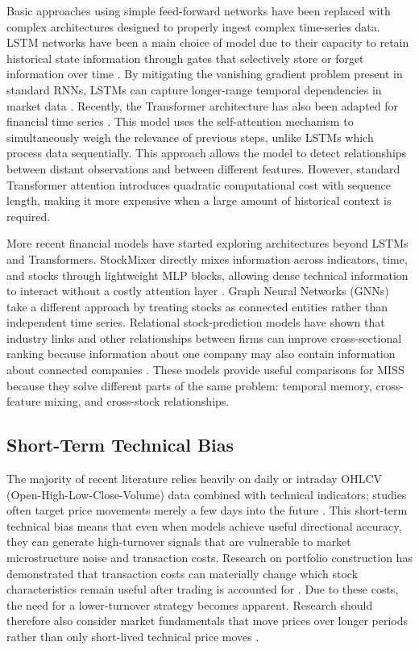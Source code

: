 \documentclass[11pt,twocolumn]{article}
\begin{document}
Basic approaches using simple feed-forward networks have been replaced
with complex architectures designed to properly ingest complex
time-series data. LSTM networks have been a main choice of model due to
their capacity to retain historical state information through gates that
selectively store or forget information over time \cite{hochreiter1997}.
By mitigating the vanishing gradient problem present in standard RNNs,
LSTMs can capture longer-range temporal dependencies in market data
\cite{rumelhart1986}. Recently, the Transformer architecture has also
been adapted for financial time series \cite{vaswani2017}. This model
uses the self-attention mechanism to simultaneously weigh the relevance
of previous steps, unlike LSTMs which process data sequentially. This
approach allows the model to detect relationships between distant
observations and between different features. However, standard
Transformer attention introduces quadratic computational cost with
sequence length, making it more expensive when a large amount of
historical context is required.

More recent financial models have started exploring architectures beyond
LSTMs and Transformers. StockMixer directly mixes information across
indicators, time, and stocks through lightweight MLP blocks, allowing
dense technical information to interact without a costly attention layer
\cite{fan2024}. Graph Neural Networks (GNNs) take a different approach by
treating stocks as connected entities rather than independent time
series. Relational stock-prediction models have shown that industry
links and other relationships between firms can improve cross-sectional
ranking because information about one company may also contain
information about connected companies \cite{feng2019,qian2024}. These
models provide useful comparisons for MISS because they solve different
parts of the same problem: temporal memory, cross-feature mixing, and
cross-stock relationships.

\subsection{Short-Term Technical Bias}

The majority of recent literature relies heavily on daily or intraday
OHLCV (Open-High-Low-Close-Volume) data combined with technical
indicators; studies often target price movements merely a few days into
the future \cite{fischer2018}. This short-term technical bias means that
even when models achieve useful directional accuracy, they can generate
high-turnover signals that are vulnerable to market microstructure noise
and transaction costs. Research on portfolio construction has
demonstrated that transaction costs can materially change which stock
characteristics remain useful after trading is accounted for
\cite{demiguel2020}. Due to these costs, the need for a lower-turnover
strategy becomes apparent. Research should therefore also consider market
fundamentals that move prices over longer periods rather than only
short-lived technical price moves \cite{shiller1981}.
\end{document}
